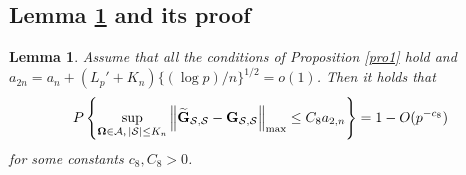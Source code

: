 \documentclass[11pt]{article}
\newtheorem{lemma}{Lemma}%
\newcommand{\bG}{\mbox{\bf G}}
\newcommand{\calA}{{\cal A}}
\newcommand{\sbOmg}{\mbox{\scriptsize\boldmath $\Omega$}}
\begin{document}
\subsection{Lemma \ref{bound-lem} and its proof} \label{appB.5}

\begin{lemma}\label{bound-lem}
Assume that all the conditions of Proposition \ref{pro1} hold and $a_{2n} = a_n +( L_{p}' + K_n) \{(\log p)/n\}^{1/2} = o(1)$. Then it holds that
\begin{align*}
P\left\{\sup_{\sbOmg \in \calA, \, |\mathcal{S}|\leq K_n}\left\| \widetilde{\bG}_{\mathcal{S},\mathcal{S}} - \bG_{\mathcal{S},\mathcal{S}} \right\|_{\max} \leq C_8 a_{2,n} \right\} = 1 - O(p^{-c_8})
\end{align*}
for some constants $c_8, C_8>0$.
\end{lemma}
\end{document}
